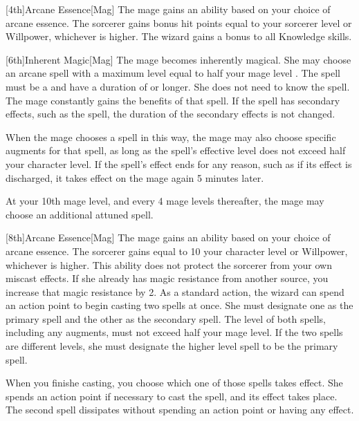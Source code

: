         [4th]{Arcane Essence}[Mag]
        The mage gains an ability based on your choice of arcane essence.
         The sorcerer gains bonus hit points equal to your sorcerer level or Willpower, whichever is higher.
         The wizard gains a  bonus to all Knowledge skills.

        [6th]{Inherent Magic}[Mag]
        The mage becomes inherently magical.
        She may choose an arcane spell with a maximum level equal to half your mage level .
        The spell must be a  and have a duration of \durshort or longer.
        She does not need to know the spell.
        The mage constantly gains the benefits of that spell.
        If the spell has secondary effects, such as the  spell, the duration of the secondary effects is not changed.

        When the mage chooses a spell in this way, the mage may also choose specific augments for that spell, as long as the spell's effective level does not exceed half your character level.
        If the spell's effect ends for any reason, such as if its effect is discharged, it takes effect on the mage again 5 minutes later.

        At your 10th mage level, and every 4 mage levels thereafter, the mage may choose an additional attuned spell.

        [8th]{Arcane Essence}[Mag]
        The mage gains an ability based on your choice of arcane essence.
         The sorcerer gains  equal to 10 \add your character level or Willpower, whichever is higher.
        This ability does not protect the sorcerer from your own miscast effects.
        If she already has magic resistance from another source, you increase that magic resistance by 2.
         As a standard action, the wizard can spend an action point to begin casting two spells at once.
        She must designate one as the primary spell and the other as the secondary spell.
        The level of both spells, including any augments, must not exceed half your mage level.
        If the two spells are different levels, she must designate the higher level spell to be the primary spell.

        When you finishe casting, you choose which one of those spells takes effect.
        She spends an action point if necessary to cast the spell, and its effect takes place.
        The second spell dissipates without spending an action point or having any effect.

